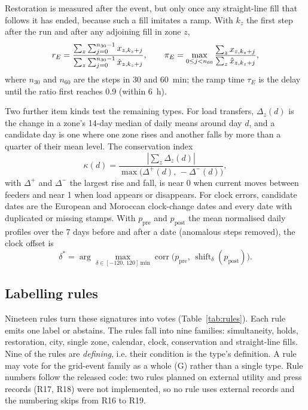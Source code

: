 Restoration is measured after the event, but only once any straight-line fill that follows it has ended, because such a fill imitates a ramp. With $k_z$ the first step after the run and after any adjoining fill in zone $z$,
\begin{equation}
r_E = \frac{\sum_{z} \sum_{j=0}^{n_{30}-1} x_{z,k_z+j}}{\sum_{z} \sum_{j=0}^{n_{30}-1} \hat{x}_{z,k_z+j}}, \qquad
\pi_E = \max_{0 \leq j < n_{60}} \frac{\sum_{z} x_{z,k_z+j}}{\sum_{z} \hat{x}_{z,k_z+j}},
\label{eq:restoration}
\end{equation}
where $n_{30}$ and $n_{60}$ are the steps in 30 and 60~min; the ramp time $\tau_E$ is the delay until the ratio first reaches 0.9 (within 6~h). %

Two further item kinds test the remaining types. For load transfers, $\Delta_z(d)$ is the change in a zone's 14-day median of daily means around day $d$, and a candidate day is one where one zone rises and another falls by more than a quarter of their mean level. The conservation index
\begin{equation}
\kappa(d) = \frac{\left| \sum_z \Delta_z(d) \right|}{\max\big(\Delta^{+}(d),\, -\Delta^{-}(d)\big)},
\label{eq:kappa}
\end{equation}
with $\Delta^{+}$ and $\Delta^{-}$ the largest rise and fall, is near 0 when current moves between feeders and near 1 when load appears or disappears. For clock errors, candidate dates are the European and Moroccan clock-change dates and every date with duplicated or missing stamps. With $p_{\mathrm{pre}}$ and $p_{\mathrm{post}}$ the mean normalised daily profiles over the 7 days before and after a date (anomalous steps removed), the clock offset is
\begin{equation}
\delta^{*} = \arg\max_{\delta \in [-120,\,120]\ \mathrm{min}} \operatorname{corr}\big(p_{\mathrm{pre}},\, \operatorname{shift}_{\delta}(p_{\mathrm{post}})\big).
\label{eq:clock}
\end{equation}

\subsection{Labelling rules}\label{sec:rules}

Nineteen rules turn these signatures into votes (Table~\ref{tab:rules}). Each rule emits one label or abstains. The rules fall into nine families: simultaneity, holds, restoration, city, single zone, calendar, clock, conservation and straight-line fills. Nine of the rules are \emph{defining}, i.e. their condition is the type's definition. A rule may vote for the grid-event family as a whole (G) rather than a single type. Rule numbers follow the released code: two rules planned on external utility and press records (R17, R18) were not implemented, so no rule uses external records and the numbering skips from R16 to R19.


